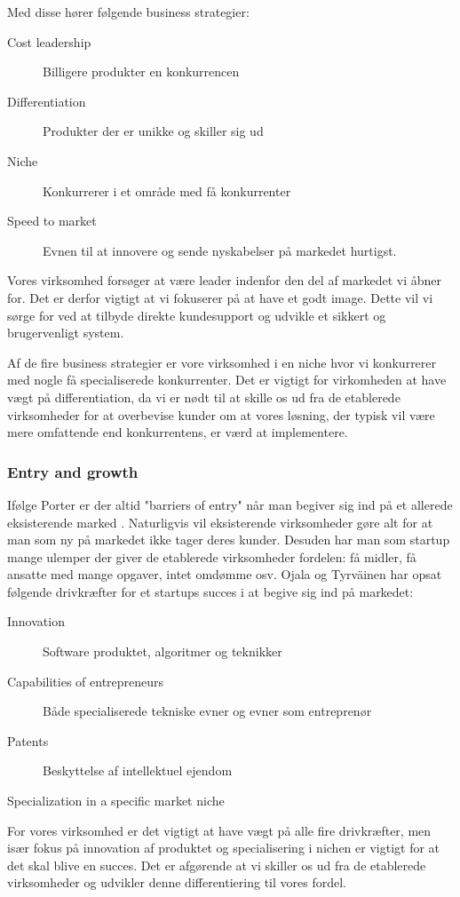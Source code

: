 Med disse hører følgende business strategier:
\begin{description}
	\item[Cost leadership] Billigere produkter en konkurrencen
	\item [Differentiation] Produkter der er unikke og skiller sig ud
	\item [Niche] Konkurrerer i et område med få konkurrenter
	\item [Speed to market] Evnen til at innovere og sende nyskabelser på markedet hurtigst.
\end{description}

Vores virksomhed forsøger at være leader indenfor den del af markedet vi åbner for.
Det er derfor vigtigt at vi fokuserer på at have et godt image.
Dette vil vi sørge for ved at tilbyde direkte kundesupport og udvikle et sikkert og brugervenligt system.

Af de fire business strategier er vore virksomhed i en niche hvor vi konkurrerer med nogle få specialiserede konkurrenter.
Det er vigtigt for virkomheden at have vægt på differentiation, da vi er nødt til at skille os ud fra de etablerede virksomheder for at overbevise kunder om at vores løsning, der typisk vil være mere omfattende end konkurrentens, er værd at implementere.

\subsubsection{Entry and growth}
Ifølge Porter er der altid "barriers of entry" når man begiver sig ind på et allerede eksisterende marked \citep[p.~50]{rose2012software}.
Naturligvis vil eksisterende virksomheder gøre alt for at man som ny på markedet ikke tager deres kunder.
Desuden har man som startup mange ulemper der giver de etablerede virksomheder fordelen: få midler, få ansatte med mange opgaver, intet omdømme osv.
Ojala og Tyrväinen har opsat følgende drivkræfter for et startups succes i at begive sig ind på markedet: \citep[p.~50]{rose2012software}

\begin{description}
	\item[Innovation] Software produktet, algoritmer og teknikker
	\item [Capabilities of entrepreneurs] Både specialiserede tekniske evner og evner som entreprenør
	\item [Patents] Beskyttelse af intellektuel ejendom
	\item [Specialization in a specific market niche] 
\end{description}

For vores virksomhed er det vigtigt at have vægt på alle fire drivkræfter, men især fokus på innovation af produktet og specialisering i nichen er vigtigt for at det skal blive en succes.
Det er afgørende at vi skiller os ud fra de etablerede virksomheder og udvikler denne differentiering til vores fordel.